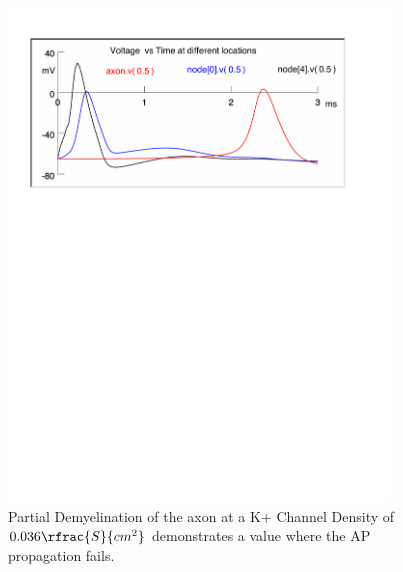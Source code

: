 \documentclass[12pt]{article}
\begin{document}
\begin{figure}[H]
\centering
\includegraphics[width=0.9\textwidth]{Results/4a-036}
\caption{\label{fig:P4a2} Partial Demyelination of the axon at a K+ Channel Density of $0.036 \rfrac{S}{cm^{2}}$ demonstrates a value where the AP propagation fails.}
\end{figure}
\end{document}
